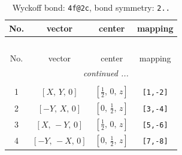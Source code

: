 \documentclass[fleqn,8pt]{jsarticle}
\begin{document}
\renewcommand{\arraystretch}{1.2}
\begin{longtable}{cccc}
\caption{Wyckoff bond: {\tt 4f@2c}, bond symmetry: {\tt 2..}}
 \\
 \hline \hline
No. & vector & center & mapping \\ \hline \endfirsthead

\multicolumn{3}{l}{\tablename\ \thetable{}} \\
 \hline \hline
No. & vector & center & mapping \\ \hline \endhead

 \hline \hline
\multicolumn{3}{r}{\footnotesize\it continued ...} \\ \endfoot

 \hline \hline
\multicolumn{3}{r}{} \\ \endlastfoot

1 & $\left[ X,\, Y,\, 0 \right]$ & $\left[ \frac{1}{2},\, 0,\, z \right]$ & {\tt [1,-2]} \\ \hline
2 & $\left[ - Y,\, X,\, 0 \right]$ & $\left[ 0,\, \frac{1}{2},\, z \right]$ & {\tt [3,-4]} \\ \hline
3 & $\left[ X,\, - Y,\, 0 \right]$ & $\left[ \frac{1}{2},\, 0,\, z \right]$ & {\tt [5,-6]} \\ \hline
4 & $\left[ - Y,\, - X,\, 0 \right]$ & $\left[ 0,\, \frac{1}{2},\, z \right]$ & {\tt [7,-8]} \\
\end{longtable}
\renewcommand{\arraystretch}{1.2}
\end{document}
